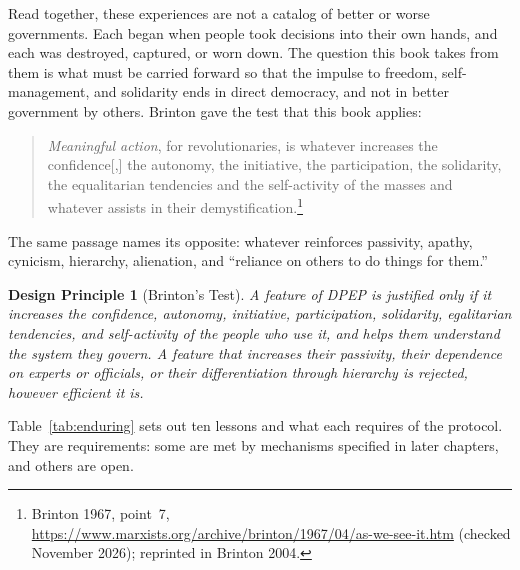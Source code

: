 \documentclass[10pt,twoside,openany]{book}
\theoremstyle{dpepstyle}
\newtheorem{designrule}{Design Principle}[chapter]
\begin{document}
Read together, these experiences are not a catalog of better or worse governments. Each began when people took decisions into their own hands, and each was destroyed, captured, or worn down. The question this book takes from them is what must be carried forward so that the impulse to freedom, self-management, and solidarity ends in direct democracy, and not in better government by others. Brinton gave the test that this book applies:
\begin{quote}
\small \emph{Meaningful action}, for revolutionaries, is whatever increases the confidence[,] the autonomy, the initiative, the participation, the solidarity, the equalitarian tendencies and the self-activity of the masses and whatever assists in their demystification.\footnote{Brinton 1967, point~7, \url{https://www.marxists.org/archive/brinton/1967/04/as-we-see-it.htm} (checked November 2026); reprinted in Brinton 2004.}
\end{quote}
The same passage names its opposite: whatever reinforces passivity, apathy, cynicism, hierarchy, alienation, and ``reliance on others to do things for them.''

\begin{designrule}[Brinton's Test]\label{dp:brinton}
A feature of DPEP is justified only if it increases the confidence, autonomy, initiative, participation, solidarity, egalitarian tendencies, and self-activity of the people who use it, and helps them understand the system they govern. A feature that increases their passivity, their dependence on experts or officials, or their differentiation through hierarchy is rejected, however efficient it is.
\end{designrule}

Table~\ref{tab:enduring} sets out ten lessons and what each requires of the protocol. They are requirements: some are met by mechanisms specified in later chapters, and others are open.
\end{document}
